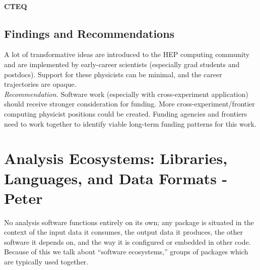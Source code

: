 \paragraph{CTEQ}

\subsection{Findings and Recommendations}
A lot of transformative ideas are introduced to the HEP computing community and are implemented by early-career scientists (especially grad students and postdocs). Support for these physicists can be minimal, and the career trajectories are opaque.\\
\textit{Recommendation.} Software work (especially with cross-experiment application) should receive stronger consideration for funding. More cross-experiment/frontier computing physicist positions could be created.  Funding agencies and frontiers need to work together to identify viable long-term funding patterns for this work.



\section{Analysis Ecosystems: Libraries, Languages, and Data Formats - Peter}
No analysis software functions entirely on its own; any package is situated in the context of the input data it consumes, the output data it produces, the other software it depends on, and the way it is configured or embedded in other code. Because of this we talk about ``software ecosystems,'' groups of packages which are typically used together.


